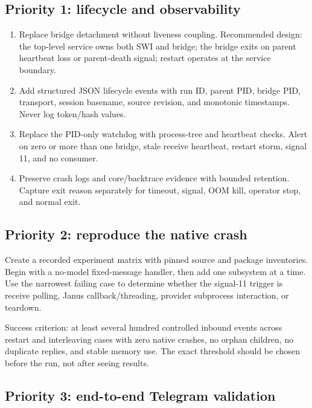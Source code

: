 \documentclass[10pt]{article}
\begin{document}
\subsection{Priority 1: lifecycle and observability}

\begin{enumerate}
  \item Replace bridge detachment without liveness coupling. Recommended design: the top-level service owns both SWI and bridge; the bridge exits on parent heartbeat loss or parent-death signal; restart operates at the service boundary.
  \item Add structured JSON lifecycle events with run ID, parent PID, bridge PID, transport, session basename, source revision, and monotonic timestamps. Never log token/hash values.
  \item Replace the PID-only watchdog with process-tree and heartbeat checks. Alert on zero or more than one bridge, stale receive heartbeat, restart storm, signal 11, and no consumer.
  \item Preserve crash logs and core/backtrace evidence with bounded retention. Capture exit reason separately for timeout, signal, OOM kill, operator stop, and normal exit.
\end{enumerate}

\subsection{Priority 2: reproduce the native crash}

Create a recorded experiment matrix with pinned source and package inventories. Begin with a no-model fixed-message handler, then add one subsystem at a time. Use the narrowest failing case to determine whether the signal-11 trigger is receive polling, Janus callback/threading, provider subprocess interaction, or teardown.

Success criterion: at least several hundred controlled inbound events across restart and interleaving cases with zero native crashes, no orphan children, no duplicate replies, and stable memory use. The exact threshold should be chosen before the run, not after seeing results.

\subsection{Priority 3: end-to-end Telegram validation}
\end{document}
